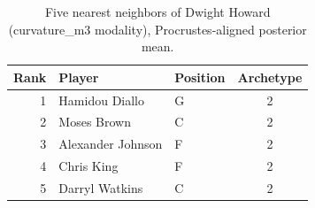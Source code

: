 \begin{table}[htbp]
  \centering\small
  \begin{tabular}{rllc}
    \toprule
    Rank & Player & Position & Archetype \\
    \midrule
    1 & Hamidou Diallo & G & 2 \\
    2 & Moses Brown & C & 2 \\
    3 & Alexander Johnson & F & 2 \\
    4 & Chris King & F & 2 \\
    5 & Darryl Watkins & C & 2 \\
    \bottomrule
  \end{tabular}
  \caption{Five nearest neighbors of Dwight Howard (curvature_m3 modality), Procrustes-aligned posterior mean.}
  \label{tab:Dwight_Howard_neighbors_curvature_m3}
\end{table}

